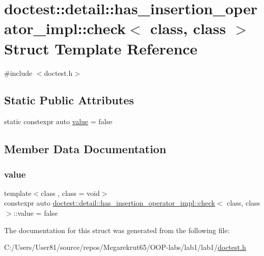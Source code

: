 \hypertarget{structdoctest_1_1detail_1_1has__insertion__operator__impl_1_1check}{}\section{doctest\+:\+:detail\+:\+:has\+\_\+insertion\+\_\+operator\+\_\+impl\+:\+:check$<$ class, class $>$ Struct Template Reference}
\label{structdoctest_1_1detail_1_1has__insertion__operator__impl_1_1check}


{\ttfamily \#include $<$doctest.\+h$>$}

\subsection*{Static Public Attributes}
\begin{DoxyCompactItemize}
\item 
static constexpr auto \mbox{\hyperlink{structdoctest_1_1detail_1_1has__insertion__operator__impl_1_1check_a23284c81951701aaabe0305a9d495040}{value}} = false
\end{DoxyCompactItemize}


\subsection{Member Data Documentation}
\mbox{\label{structdoctest_1_1detail_1_1has__insertion__operator__impl_1_1check_a23284c81951701aaabe0305a9d495040}} 
\subsubsection{\texorpdfstring{value}{value}}
{\footnotesize\ttfamily template$<$class , class  = void$>$ \\
constexpr auto \mbox{\hyperlink{structdoctest_1_1detail_1_1has__insertion__operator__impl_1_1check}{doctest\+::detail\+::has\+\_\+insertion\+\_\+operator\+\_\+impl\+::check}}$<$ class, class $>$\+::value = false\hspace{0.3cm}{\ttfamily [static]}}



The documentation for this struct was generated from the following file\+:\begin{DoxyCompactItemize}
\item 
C\+:/\+Users/\+User81/source/repos/\+Megarekrut65/\+O\+O\+P-\/labs/lab1/lab1/\mbox{\hyperlink{doctest_8h}{doctest.\+h}}\end{DoxyCompactItemize}
